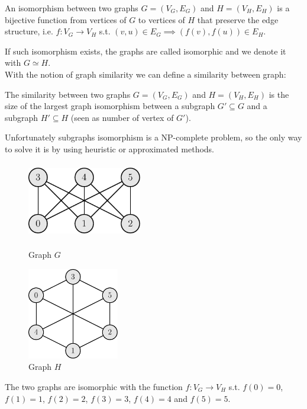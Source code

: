 \begin{definizione}
	An isomorphism between two graphs $G=(V_{G}, E_{G})$ and $H=(V_{H}, E_{H})$ is a bijective function from vertices of $G$ to vertices of $H$ that preserve the edge structure, i.e.  $f : V_{G} \rightarrow V_{H}$ s.t. $(v, u) \in E_{G} \implies (f(v), f(u)) \in E_{H}$.
\end{definizione}

If such isomorphism exists, the graphs are called isomorphic and we denote it with $G \simeq H$.\\ 

With the notion of graph similarity we can define a similarity between graph:

\begin{definizione}
	The similarity between two graphs $G=(V_{G}, E_{G})$ and $H=(V_{H}, E_{H})$ is the size of the largest graph isomorphism between a subgraph $G' \subseteq G$ and a subgraph $H' \subseteq H$ (seen as number of vertex of $G'$).
\end{definizione}

Unfortunately subgraphs isomorphism is a NP-complete problem, so the only way to solve it is by using heuristic or approximated methods.

\clearpage 
\begin{esempio}
	\begin{figure}[h]
		\centering
		\begin{minipage}[t]{.45\textwidth}
			\centering
			\includegraphics[width=5cm,height=3.33cm]{figure/figure-2-3}
			\caption{Graph $G$}
		\end{minipage}\hfill
		\begin{minipage}[t]{.45\textwidth}
			\centering
			\includegraphics[width=4cm,height=4cm]{figure/figure-2-4}
			\caption{Graph $H$}
		\end{minipage}
	\end{figure}

	The two graphs are isomorphic with the function $f : V_{G} \rightarrow V_{H}$ s.t. $f(0) = 0$, $f(1) = 1$, $f(2) = 2$, $f(3) = 3$, $f(4) = 4$ and $f(5) = 5$. 
	
\end{esempio}


